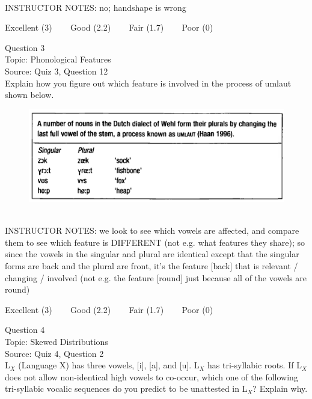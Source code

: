 \documentclass[12pt]{article}
\begin{document}
~\\
INSTRUCTOR NOTES: no; handshape is wrong


\vfill
Excellent (3) ~~~ Good (2.2) ~~~ Fair (1.7) ~~~ Poor (0)
\newpage

{\large Question 3}\\

Topic: Phonological Features\\
Source: Quiz 3, Question 12\\

Explain how you figure out which feature is involved in the process of umlaut shown below.\\

\begin{figure}[H]
\includegraphics{../images/dutch.png}
\end{figure}

~\\
INSTRUCTOR NOTES: we look to see which vowels are affected, and compare them to see which feature is DIFFERENT (not e.g. what features they share); so since the vowels in the singular and plural are identical except that the singular forms are back and the plural are front, it's the feature [back] that is relevant / changing / involved (not e.g. the feature [round] just because all of the vowels are round)


\vfill
Excellent (3) ~~~ Good (2.2) ~~~ Fair (1.7) ~~~ Poor (0)
\newpage

{\large Question 4}\\

Topic: Skewed Distributions\\
Source: Quiz 4, Question 2\\

L$_X$ (Language X) has three vowels, [i], [a], and [u]. L$_X$ has tri-syllabic roots. If L$_X$ does not allow non-identical high vowels to co-occur, which one of the following tri-syllabic vocalic sequences do you predict to be unattested in L$_X$? Explain why.\\
\end{document}

